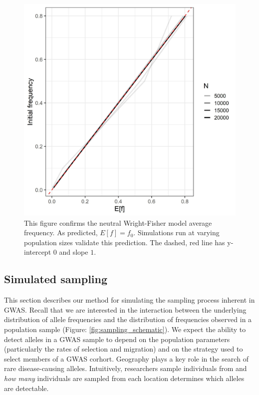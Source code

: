 \begin{figure}[h]
    \centering
    \includegraphics[scale=0.5]{img/mean_f.jpg}
    \caption{This figure confirms the neutral Wright-Fisher model average frequency. As predicted, $E[f] = f_0$. Simulations run at varying population sizes validate this prediction. The dashed, red line has y-intercept $0$ and slope $1$.}
    \label{fig:mean_wf}
\end{figure}


\newpage
\subsection{Simulated sampling}
This section describes our method for simulating the sampling process inherent in GWAS. Recall that we are interested in the interaction between the underlying distribution of allele frequencies and the distribution of frequencies observed in a population sample (Figure: \ref{fig:sampling_schematic}). We expect the ability to detect alleles in a GWAS sample to depend on the population parameters (particularly the rates of selection and migration) and on the strategy used to select members of a GWAS corhort. Geography plays a key role in the search of rare disease-causing alleles. Intuitively,  researchers sample individuals from and \textit{how many} individuals are sampled from each location determines which alleles are detectable.



